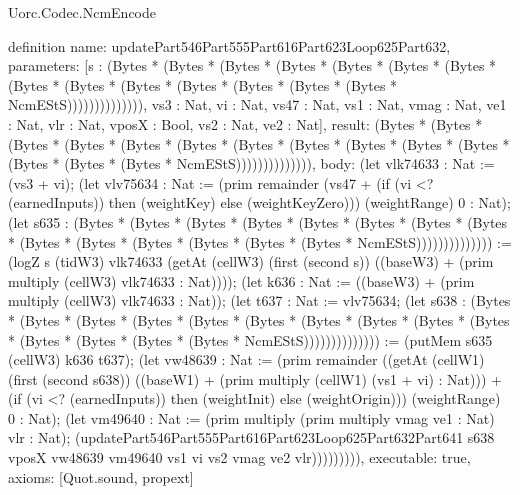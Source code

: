 \begin{lexlean}{Uorc.Codec.NcmEncode}
\begin{semanticmodule}
definition{
  name: updatePart546Part555Part616Part623Loop625Part632,
  parameters: [s : (Bytes * (Bytes * (Bytes * (Bytes * (Bytes * (Bytes * (Bytes * (Bytes * (Bytes * (Bytes * (Bytes * (Bytes * (Bytes * (Bytes * NcmEStS)))))))))))))), vs3 : Nat, vi : Nat, vs47 : Nat, vs1 : Nat, vmag : Nat, ve1 : Nat, vlr : Nat, vposX : Bool, vs2 : Nat, ve2 : Nat],
  result: (Bytes * (Bytes * (Bytes * (Bytes * (Bytes * (Bytes * (Bytes * (Bytes * (Bytes * (Bytes * (Bytes * (Bytes * (Bytes * (Bytes * NcmEStS)))))))))))))),
  body: (let vlk74633 : Nat := (vs3 + vi); (let vlv75634 : Nat := (prim remainder (vs47 + (if (vi <? (earnedInputs)) then (weightKey) else (weightKeyZero))) (weightRange) 0 : Nat); (let s635 : (Bytes * (Bytes * (Bytes * (Bytes * (Bytes * (Bytes * (Bytes * (Bytes * (Bytes * (Bytes * (Bytes * (Bytes * (Bytes * (Bytes * NcmEStS)))))))))))))) := (logZ s (tidW3) vlk74633 (getAt (cellW3) (first (second s)) ((baseW3) + (prim multiply (cellW3) vlk74633 : Nat)))); (let k636 : Nat := ((baseW3) + (prim multiply (cellW3) vlk74633 : Nat)); (let t637 : Nat := vlv75634; (let s638 : (Bytes * (Bytes * (Bytes * (Bytes * (Bytes * (Bytes * (Bytes * (Bytes * (Bytes * (Bytes * (Bytes * (Bytes * (Bytes * (Bytes * NcmEStS)))))))))))))) := (putMem s635 (cellW3) k636 t637); (let vw48639 : Nat := (prim remainder ((getAt (cellW1) (first (second s638)) ((baseW1) + (prim multiply (cellW1) (vs1 + vi) : Nat))) + (if (vi <? (earnedInputs)) then (weightInit) else (weightOrigin))) (weightRange) 0 : Nat); (let vm49640 : Nat := (prim multiply (prim multiply vmag ve1 : Nat) vlr : Nat); (updatePart546Part555Part616Part623Loop625Part632Part641 s638 vposX vw48639 vm49640 vs1 vi vs2 vmag ve2 vlr))))))))),
  executable: true,
  axioms: [Quot.sound, propext]
}


\end{semanticmodule}
\end{lexlean}
